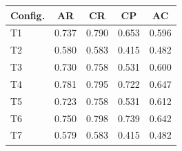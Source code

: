 \begin{tabular}{lcccc}
\hline
\textbf{Config.} & \textbf{AR} & \textbf{CR} & \textbf{CP} & \textbf{AC} \\
\hline
T1 & 0.737 & 0.790 & 0.653 & 0.596 \\
T2 & 0.580 & 0.583 & 0.415 & 0.482 \\
T3 & 0.730 & 0.758 & 0.531 & 0.600 \\
T4 & 0.781 & 0.795 & 0.722 & 0.647 \\
T5 & 0.723 & 0.758 & 0.531 & 0.612 \\
T6 & 0.750 & 0.798 & 0.739 & 0.642 \\
T7 & 0.579 & 0.583 & 0.415 & 0.482 \\
\hline
\end{tabular}
